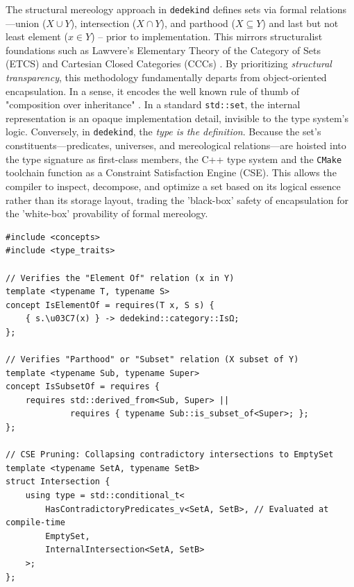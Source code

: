 \documentclass[11pt, a4paper]{report}
\begin{document}
The structural mereology \cite{mormann2013structural} approach in \texttt{dedekind} defines sets via formal relations—union ($X \cup Y$), intersection ($X \cap Y$), and parthood ($X \subseteq Y$) and last but not least element ($x \in Y$)  -- prior to implementation.
This mirrors structuralist foundations such as Lawvere’s Elementary Theory of the Category of Sets (ETCS) \cite{lawvere2005elementary} and Cartesian Closed Categories (CCCs) \cite{lambek1988introduction, nlab:structural_set_theory}.
By prioritizing \textit{structural transparency}, this methodology fundamentally departs from object-oriented encapsulation. 
In a sense, it encodes the well known rule of thumb of "composition over inheritance" \cite{marquis2022structuralist}.
In a standard \texttt{std::set}, the internal representation is an opaque implementation detail, invisible to the type system’s logic. 
Conversely, in \texttt{dedekind}, the \textit{type is the definition}. 
Because the set’s constituents—predicates, universes, and mereological relations—are hoisted into the type signature as first-class members, the C++ type system and the \texttt{CMake} toolchain function as a Constraint Satisfaction Engine (CSE). 
This allows the compiler to inspect, decompose, and optimize a set based on its logical essence rather than its storage layout, trading the 'black-box' safety of encapsulation for the 'white-box' provability of formal mereology.

\begin{lstlisting}[caption={Compile-time mereological verification using C++23 concepts.}, label={lst:concepts}]
#include <concepts>
#include <type_traits>

// Verifies the "Element Of" relation (x in Y)
template <typename T, typename S>
concept IsElementOf = requires(T x, S s) {
    { s.\u03C7(x) } -> dedekind::category::IsΩ;
};

// Verifies "Parthood" or "Subset" relation (X subset of Y)
template <typename Sub, typename Super>
concept IsSubsetOf = requires {
    requires std::derived_from<Sub, Super> || 
             requires { typename Sub::is_subset_of<Super>; };
};

// CSE Pruning: Collapsing contradictory intersections to EmptySet
template <typename SetA, typename SetB>
struct Intersection {
    using type = std::conditional_t<
        HasContradictoryPredicates_v<SetA, SetB>, // Evaluated at compile-time
        EmptySet,
        InternalIntersection<SetA, SetB>
    >;
};
\end{lstlisting}
\end{document}
